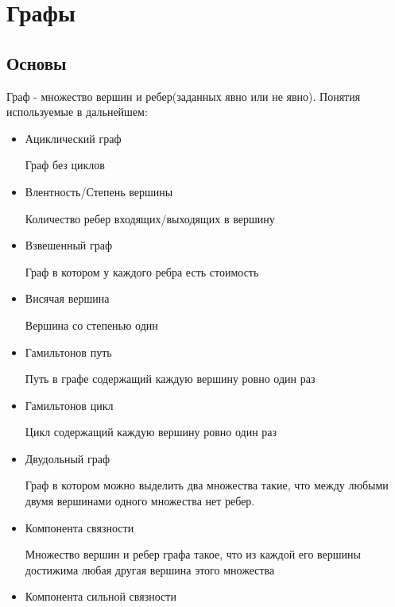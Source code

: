\chapter{Графы}
\section{Основы}
Граф - множество вершин и ребер(заданных явно или не явно). Понятия используемые в дальнейшем:
\begin{itemize} 
\item 
    Ациклический граф
    \begin{mydef}
        Граф без циклов
    \end{mydef}
\item     
    Влентность/Степень вершины
    \begin{mydef}
        Количество ребер входящих/выходящих в вершину
    \end{mydef}
\item     
    Взвешенный граф
    \begin{mydef}
        Граф в котором у каждого ребра есть стоимость
    \end{mydef}
\item     
    Висячая вершина
    \begin{mydef}
        Вершина со степенью один
    \end{mydef}
\item     
    Гамильтонов путь
    \begin{mydef}
        Путь в графе содержащий каждую вершину ровно один раз
    \end{mydef}
\item     
    Гамильтонов цикл
    \begin{mydef}
        Цикл содержащий каждую вершину ровно один раз
    \end{mydef}
\item     
    Двудольный граф
    \begin{mydef}
        Граф в котором можно выделить два множества такие, что между         любыми двумя вершинами одного множества нет ребер.
    \end{mydef}
\item     
    Компонента связности
    \begin{mydef}
        Множество вершин и ребер графа такое, что из каждой его вершины
        достижима любая другая вершина этого множества
    \end{mydef}
\item     
    Компонента сильной связности

\end{itemize}
